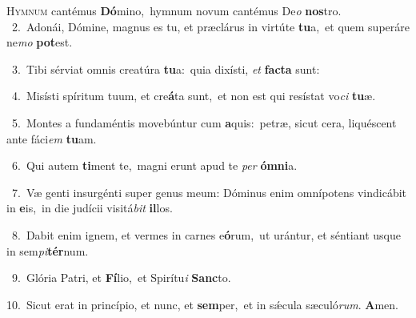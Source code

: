 \lettrine{\initial\textcolor{\initialcolor}{H}}{ymnum} cantémus \textbf{Dó}\-mino,~\star hymnum novum cantémus De\textit{o} \textbf{nos}\-tro.\\
{\numbfont\textcolor{\numbcolor}{~2.}}~Adonái, Dómine, magnus es tu, et præclárus in virtúte \textbf{tu}\-a,~\star et quem superáre ne\textit{mo} \textbf{pot}\-est.\par
{\numbfont\textcolor{\numbcolor}{~3.}}~Tibi sérviat omnis creatúra \textbf{tu}\-a:~\star quia dixísti, \textit{et} \textbf{fac}\-\textbf{ta} sunt:\par
{\numbfont\textcolor{\numbcolor}{~4.}}~Misísti spíritum tuum, et cre\-\textbf{á}\-ta sunt,~\star et non est qui resístat vo\textit{ci} \textbf{tu}\-æ.\par
{\numbfont\textcolor{\numbcolor}{~5.}}~Montes a fundaméntis movebúntur cum \textbf{a}\-quis:~\star petræ, sicut cera, liquéscent ante fáci\textit{em} \textbf{tu}\-am.\par
{\numbfont\textcolor{\numbcolor}{~6.}}~Qui autem \textbf{ti}\-ment te,~\star magni erunt apud te \textit{per} \textbf{óm}\-\textbf{ni}a.\par
{\numbfont\textcolor{\numbcolor}{~7.}}~Væ genti insurgénti super genus meum: Dóminus enim omnípotens vindicábit in \textbf{e}\-is,~\star in die judícii visitá\textit{bit} \textbf{il}\-los.\par
{\numbfont\textcolor{\numbcolor}{~8.}}~Dabit enim ignem, et vermes in carnes e\-\textbf{ó}\-rum,~\star ut urántur, et séntiant usque in sem\-\textit{pi}\-\textbf{tér}num.\par
{\numbfont\textcolor{\numbcolor}{~9.}}~Glória Patri, et \textbf{Fí}\-lio,~\star et Spirítu\textit{i} \textbf{Sanc}\-to.\par
{\numbfont\textcolor{\numbcolor}{10.}}~Sicut erat in princípio, et nunc, et \textbf{sem}\-per,~\star et in sǽcula sæculó\-\textit{rum}\-. \textbf{A}\-men.\par
